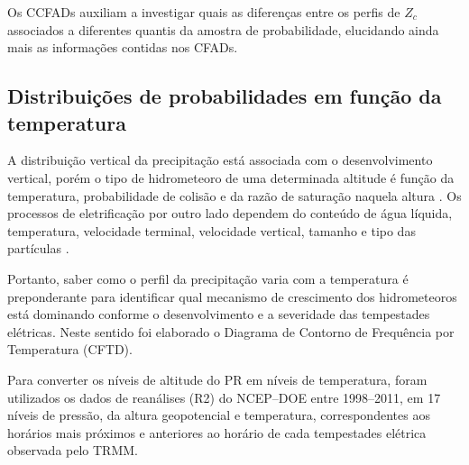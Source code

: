 
Os CCFADs auxiliam a investigar quais as diferenças entre os perfis de $Z_c$ associados a diferentes quantis da amostra de probabilidade, elucidando ainda mais as informações contidas nos CFADs.


\subsection{Distribuições de probabilidades em função da  temperatura}

A distribuição vertical da precipitação está associada com o desenvolvimento vertical, porém o tipo de hidrometeoro de uma  determinada altitude é função da temperatura, probabilidade de colisão e da razão de saturação naquela altura \cite[p.~263]{mason1971_2ed}. Os processos de eletrificação por outro lado dependem do conteúdo de água líquida, temperatura, velocidade terminal, velocidade vertical, tamanho e tipo das partículas \cite{Takahashi1978,Saunders1999,Takahashi2002,avila2009}.

Portanto, saber como o perfil da precipitação varia com a temperatura é preponderante para identificar qual mecanismo de crescimento dos hidrometeoros está dominando conforme o desenvolvimento e a severidade das tempestades elétricas. Neste sentido foi elaborado o Diagrama de Contorno de Frequência por Temperatura (CFTD).  




Para converter os níveis de altitude do PR em níveis de temperatura, foram utilizados os dados de reanálises (R2) do NCEP--DOE entre 1998--2011, em 17 níveis de pressão, da altura geopotencial e temperatura, correspondentes aos horários mais próximos e anteriores ao horário de cada tempestades elétrica observada pelo TRMM.

